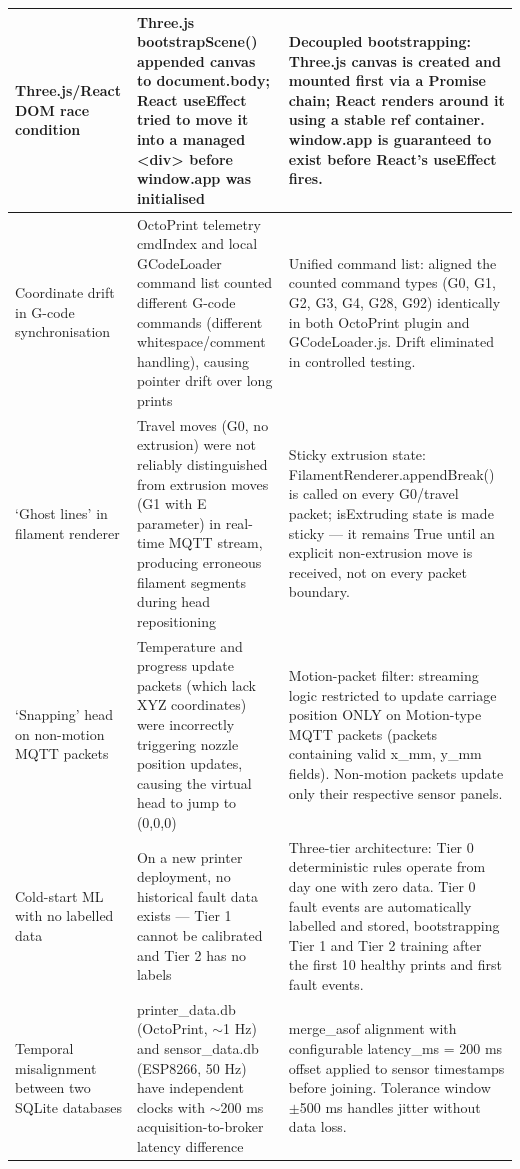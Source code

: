 \begin{longtable}{|P{3.2cm}|P{3.8cm}|P{7.0cm}|}
	Three.js/React DOM race condition & Three.js bootstrapScene() appended canvas to document.body; React useEffect tried to move it into a managed <div> before window.app was initialised & Decoupled bootstrapping: Three.js canvas is created and mounted first via a Promise chain; React renders around it using a stable ref container. window.app is guaranteed to exist before React's useEffect fires. \\
	\hline
	Coordinate drift in G-code synchronisation & OctoPrint telemetry cmdIndex and local GCodeLoader command list counted different G-code commands (different whitespace/comment handling), causing pointer drift over long prints & Unified command list: aligned the counted command types (G0, G1, G2, G3, G4, G28, G92) identically in both OctoPrint plugin and GCodeLoader.js. Drift eliminated in controlled testing. \\
	\hline
	`Ghost lines' in filament renderer & Travel moves (G0, no extrusion) were not reliably distinguished from extrusion moves (G1 with E parameter) in real-time MQTT stream, producing erroneous filament segments during head repositioning & Sticky extrusion state: FilamentRenderer.appendBreak() is called on every G0/travel packet; isExtruding state is made sticky --- it remains True until an explicit non-extrusion move is received, not on every packet boundary. \\
	\hline
	`Snapping' head on non-motion MQTT packets & Temperature and progress update packets (which lack XYZ coordinates) were incorrectly triggering nozzle position updates, causing the virtual head to jump to (0,0,0) & Motion-packet filter: streaming logic restricted to update carriage position ONLY on Motion-type MQTT packets (packets containing valid x\_mm, y\_mm fields). Non-motion packets update only their respective sensor panels. \\
	\hline
	Cold-start ML with no labelled data & On a new printer deployment, no historical fault data exists --- Tier 1 cannot be calibrated and Tier 2 has no labels & Three-tier architecture: Tier 0 deterministic rules operate from day one with zero data. Tier 0 fault events are automatically labelled and stored, bootstrapping Tier 1 and Tier 2 training after the first 10 healthy prints and first fault events. \\
	\hline
	Temporal misalignment between two SQLite databases & printer\_data.db (OctoPrint, $\sim$1 Hz) and sensor\_data.db (ESP8266, 50 Hz) have independent clocks with $\sim$200 ms acquisition-to-broker latency difference & merge\_asof alignment with configurable latency\_ms = 200 ms offset applied to sensor timestamps before joining. Tolerance window $\pm$500 ms handles jitter without data loss. \\

\end{longtable}
